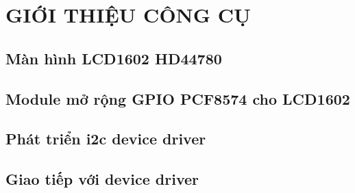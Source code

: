 \chapter{GIỚI THIỆU CÔNG CỤ}
\section{Màn hình LCD1602 HD44780}
\section{Module mở rộng GPIO PCF8574 cho LCD1602}
\section{Phát triển \acrshort{i2c} device driver}
\section {Giao tiếp với device driver}